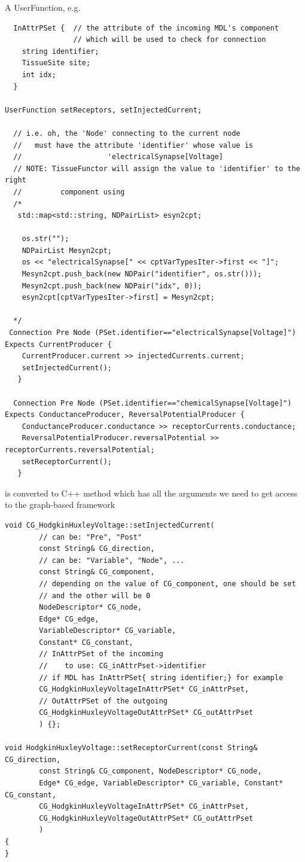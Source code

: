 A UserFunction, e.g. 
{\tiny
\begin{lstlisting}
  InAttrPSet {  // the attribute of the incoming MDL's component
                // which will be used to check for connection 
    string identifier;
    TissueSite site;
    int idx;
  }

UserFunction setReceptors, setInjectedCurrent;

  // i.e. oh, the 'Node' connecting to the current node
  //   must have the attribute 'identifier' whose value is
  //                    'electricalSynapse[Voltage]
  // NOTE: TissueFunctor will assign the value to 'identifier' to the right
  //         component using
  /*
   std::map<std::string, NDPairList> esyn2cpt;
 
    os.str("");
    NDPairList Mesyn2cpt;
    os << "electricalSynapse[" << cptVarTypesIter->first << "]";
    Mesyn2cpt.push_back(new NDPair("identifier", os.str()));
    Mesyn2cpt.push_back(new NDPair("idx", 0));
    esyn2cpt[cptVarTypesIter->first] = Mesyn2cpt;
  
  */
 Connection Pre Node (PSet.identifier=="electricalSynapse[Voltage]") Expects CurrentProducer {
    CurrentProducer.current >> injectedCurrents.current;
    setInjectedCurrent();
   }

  Connection Pre Node (PSet.identifier=="chemicalSynapse[Voltage]") Expects ConductanceProducer, ReversalPotentialProducer {
    ConductanceProducer.conductance >> receptorCurrents.conductance;
    ReversalPotentialProducer.reversalPotential >> receptorCurrents.reversalPotential;
    setReceptorCurrent();
   }
\end{lstlisting}
}
is converted to C++ method which has all the arguments we need to get access to
the graph-based framework
\begin{lstlisting}
void CG_HodgkinHuxleyVoltage::setInjectedCurrent(
        // can be: "Pre", "Post"
        const String& CG_direction,
        // can be: "Variable", "Node", ... 
        const String& CG_component,
        // depending on the value of CG_component, one should be set
        // and the other will be 0
        NodeDescriptor* CG_node, 
        Edge* CG_edge, 
        VariableDescriptor* CG_variable, 
        Constant* CG_constant,
        // InAttrPSet of the incoming
        //    to use: CG_inAttrPset->identifier
        // if MDL has InAttrPSet{ string identifier;} for example
        CG_HodgkinHuxleyVoltageInAttrPSet* CG_inAttrPset,
        // OutAttrPSet of the outgoing
        CG_HodgkinHuxleyVoltageOutAttrPSet* CG_outAttrPset
        ) {};

void HodgkinHuxleyVoltage::setReceptorCurrent(const String& CG_direction, 
        const String& CG_component, NodeDescriptor* CG_node, 
        Edge* CG_edge, VariableDescriptor* CG_variable, Constant* CG_constant,
        CG_HodgkinHuxleyVoltageInAttrPSet* CG_inAttrPset,
        CG_HodgkinHuxleyVoltageOutAttrPSet* CG_outAttrPset
        ) 
{
}

\end{lstlisting}

